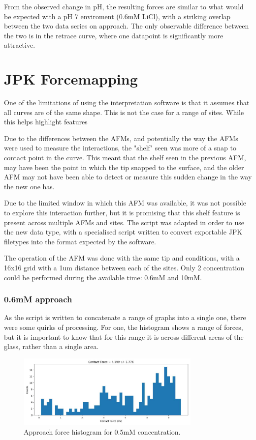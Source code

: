 From the observed change in pH, the resulting forces are similar to what would be expected with a pH 7 enviroment (0.6mM LiCl), with a striking overlap between the two data series on approach. The only observable difference between the two is in the retrace curve, where one datapoint is significantly more attractive. 

\newpage
\section{JPK Forcemapping}

One of the limitations of using the interpretation software is that it assumes that all curves are of the same shape. This is not the case for a range of sites. While this helps highlight features 

Due to the differences between the AFMs, and potentially the way the AFMs were used to measure the interactions, the "shelf" seen was more of a snap to contact point in the curve. This meant that the shelf seen in the previous AFM, may have been the point in which the tip snapped to the surface, and the older AFM may not have been able to detect or measure this sudden change in the way the new one has. 

Due to the limited window in which this AFM was available, it was not possible to explore this interaction further, but it is promising that this shelf feature is present across multiple AFMs and sites. The script was adapted in order to use the new data type, with a specialised script written to convert exportable JPK filetypes into the format expected by the software.

The operation of the AFM was done with the same tip and conditions, with a 16x16 grid with a 1um distance between each of the sites. Only 2 concentration could be performed during the available time: 0.6mM and 10mM.

\subsubsection{0.6mM approach}

As the script is written to concatenate a range of graphs into a single one, there were some quirks of processing. For one, the histogram shows a range of forces, but it is important to know that for this range it is across different areas of the glass, rather than a single area.

\begin{figure}[h]
    \centering
    \includegraphics[width=0.8\textwidth]{chapter7/ForceMaps/0.5mM/approach_f_c_hist.jpg}
    \caption{Approach force histogram for 0.5mM concentration.}
    \label{fig:approach_f_c_hist_0.5mM}
\end{figure}

